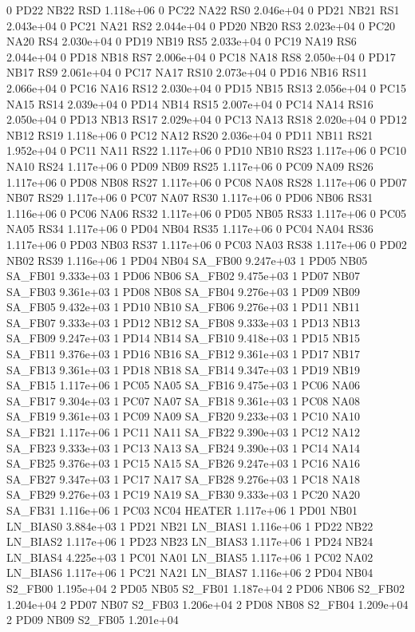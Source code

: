 0 PD22 NB22 RSD 1.118e+06 
0 PC22 NA22 RS0 2.046e+04 
0 PD21 NB21 RS1 2.043e+04 
0 PC21 NA21 RS2 2.044e+04 
0 PD20 NB20 RS3 2.023e+04 
0 PC20 NA20 RS4 2.030e+04 
0 PD19 NB19 RS5 2.033e+04 
0 PC19 NA19 RS6 2.044e+04 
0 PD18 NB18 RS7 2.006e+04 
0 PC18 NA18 RS8 2.050e+04 
0 PD17 NB17 RS9 2.061e+04 
0 PC17 NA17 RS10 2.073e+04 
0 PD16 NB16 RS11 2.066e+04 
0 PC16 NA16 RS12 2.030e+04 
0 PD15 NB15 RS13 2.056e+04 
0 PC15 NA15 RS14 2.039e+04 
0 PD14 NB14 RS15 2.007e+04 
0 PC14 NA14 RS16 2.050e+04 
0 PD13 NB13 RS17 2.029e+04 
0 PC13 NA13 RS18 2.020e+04 
0 PD12 NB12 RS19 1.118e+06 
0 PC12 NA12 RS20 2.036e+04 
0 PD11 NB11 RS21 1.952e+04 
0 PC11 NA11 RS22 1.117e+06 
0 PD10 NB10 RS23 1.117e+06 
0 PC10 NA10 RS24 1.117e+06 
0 PD09 NB09 RS25 1.117e+06 
0 PC09 NA09 RS26 1.117e+06 
0 PD08 NB08 RS27 1.117e+06 
0 PC08 NA08 RS28 1.117e+06 
0 PD07 NB07 RS29 1.117e+06 
0 PC07 NA07 RS30 1.117e+06 
0 PD06 NB06 RS31 1.116e+06 
0 PC06 NA06 RS32 1.117e+06 
0 PD05 NB05 RS33 1.117e+06 
0 PC05 NA05 RS34 1.117e+06 
0 PD04 NB04 RS35 1.117e+06 
0 PC04 NA04 RS36 1.117e+06 
0 PD03 NB03 RS37 1.117e+06 
0 PC03 NA03 RS38 1.117e+06 
0 PD02 NB02 RS39 1.116e+06 
1 PD04 NB04 SA_FB00 9.247e+03 
1 PD05 NB05 SA_FB01 9.333e+03 
1 PD06 NB06 SA_FB02 9.475e+03 
1 PD07 NB07 SA_FB03 9.361e+03 
1 PD08 NB08 SA_FB04 9.276e+03 
1 PD09 NB09 SA_FB05 9.432e+03 
1 PD10 NB10 SA_FB06 9.276e+03 
1 PD11 NB11 SA_FB07 9.333e+03 
1 PD12 NB12 SA_FB08 9.333e+03 
1 PD13 NB13 SA_FB09 9.247e+03 
1 PD14 NB14 SA_FB10 9.418e+03 
1 PD15 NB15 SA_FB11 9.376e+03 
1 PD16 NB16 SA_FB12 9.361e+03 
1 PD17 NB17 SA_FB13 9.361e+03 
1 PD18 NB18 SA_FB14 9.347e+03 
1 PD19 NB19 SA_FB15 1.117e+06 
1 PC05 NA05 SA_FB16 9.475e+03 
1 PC06 NA06 SA_FB17 9.304e+03 
1 PC07 NA07 SA_FB18 9.361e+03 
1 PC08 NA08 SA_FB19 9.361e+03 
1 PC09 NA09 SA_FB20 9.233e+03 
1 PC10 NA10 SA_FB21 1.117e+06 
1 PC11 NA11 SA_FB22 9.390e+03 
1 PC12 NA12 SA_FB23 9.333e+03 
1 PC13 NA13 SA_FB24 9.390e+03 
1 PC14 NA14 SA_FB25 9.376e+03 
1 PC15 NA15 SA_FB26 9.247e+03 
1 PC16 NA16 SA_FB27 9.347e+03 
1 PC17 NA17 SA_FB28 9.276e+03 
1 PC18 NA18 SA_FB29 9.276e+03 
1 PC19 NA19 SA_FB30 9.333e+03 
1 PC20 NA20 SA_FB31 1.116e+06 
1 PC03 NC04 HEATER 1.117e+06 
1 PD01 NB01 LN_BIAS0 3.884e+03 
1 PD21 NB21 LN_BIAS1 1.116e+06 
1 PD22 NB22 LN_BIAS2 1.117e+06 
1 PD23 NB23 LN_BIAS3 1.117e+06 
1 PD24 NB24 LN_BIAS4 4.225e+03 
1 PC01 NA01 LN_BIAS5 1.117e+06 
1 PC02 NA02 LN_BIAS6 1.117e+06 
1 PC21 NA21 LN_BIAS7 1.116e+06 
2 PD04 NB04 S2_FB00 1.195e+04 
2 PD05 NB05 S2_FB01 1.187e+04 
2 PD06 NB06 S2_FB02 1.204e+04 
2 PD07 NB07 S2_FB03 1.206e+04 
2 PD08 NB08 S2_FB04 1.209e+04 
2 PD09 NB09 S2_FB05 1.201e+04 
